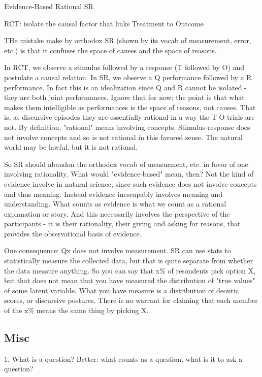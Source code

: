 \documentclass[11pt,twoside]{article}
\begin{document}
Evidence-Based Rational SR

RCT: isolate the causal factor that links Treatment to Outcome

THe mistake make by orthodox SR (shown by its vocab of measurement,
error, etc.) is that it confuses the space of causes and the space of
reasons.

In RCT, we observe a stimulus followed by a response (T followed by O)
and postulate a causal relation.  In SR, we observe a Q performance
followed by a R performance.  In fact this is an idealization since Q
and R cannot be isolated - they are both joint performances.  Ignore
that for now; the point is that what makes them intelligible as
performances is the space of reasons, not causes.  That is, as
discursive episodes they are essentially rational in a way the T-O
trials are not.  By definition, "rational" means involving concepts.
Stimulus-response does not involve concepts and so is not rational in
this favored sense.  The natural world may be lawful, but it is not
rational.

So SR should abandon the orthodox vocab of measurment, etc. in favor
of one involving rationality.  What would "evidence-based" mean, then?
Not the kind of evidence involve in natural science, since such
evidence does not involve concepts and thus meaning.  Instead evidence
inescapably involves meaning and understanding.  What counts as
evidence is what we count as a rational explanation or story.  And
this necessarily involves the perspective of the participants - it is
their rationality, their giving and asking for reasons, that provides
the observational basis of evidence.

 One consequence: Qx does not involve measurement.  SR can use stats
 to statistically measure the collected data, but that is quite
 separate from whether the data measure anything.  So you can say that
 x\% of resondents pick option X, but that does not mean that you have
 measured the distribution of "true values" of some latent variable.
 What you have measure is a distribution of deontic scores, or
 discursive postures.  There is no warrant for claiming that each
 member of the x\% means the same thing by picking X.

\subsection{Misc}

1.  What is a question?  Better: what counts as a question, what is it to ask a question?
\end{document}
